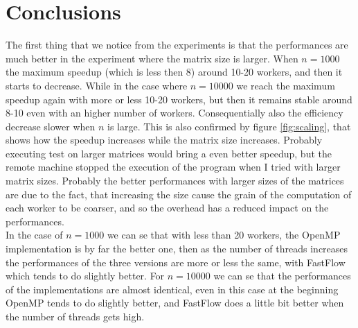 \documentclass[12pt]{article}
\begin{document}
	\section{Conclusions}
	The first thing that we notice from the experiments is that the performances are much better in the experiment where the matrix size is larger. When $n = 1000$ the maximum speedup (which is less then 8) around 10-20 workers, and then it starts to decrease. While in the case where $n = 10000$ we reach the maximum speedup again with more or less 10-20 workers, but then it remains stable around 8-10 even with an higher number of workers. Consequentially also the efficiency decrease slower when $n$ is large. This is also confirmed by figure \ref{fig:scaling}, that shows how the speedup increases while the matrix size increases. Probably executing test on larger matrices would bring a even better speedup, but the remote machine stopped the execution of the program when I tried with larger matrix sizes. Probably the better performances with larger sizes of the matrices are due to the fact, that increasing the size cause the grain of the computation of each worker to be coarser, and so the overhead has a reduced impact on the performances.\\
	In the case of $n = 1000$ we can se that with less than 20 workers, the OpenMP implementation is by far the better one, then as the number of threads increases the performances of the three versions are more or less the same, with FastFlow which tends to do slightly better. For $n = 10000$ we can se that the performances of the implementations are almost identical, even in this case at the beginning OpenMP tends to do slightly better, and FastFlow does a little bit better when the number of threads gets high.\\
	
	
\end{document}

